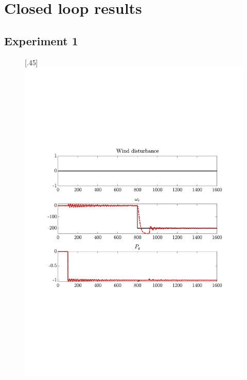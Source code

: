 \section{Closed loop results} \label{app:cl_results}


\subsection{Experiment 1}

\begin{figure}[H]
    \centering

    [.45\textwidth]{\includegraphics[width=1\linewidth, scale=1, trim=55 230 55 120,clip]{fig/Open_loop/exp_1_ref.pdf}}
%

\end{figure}
